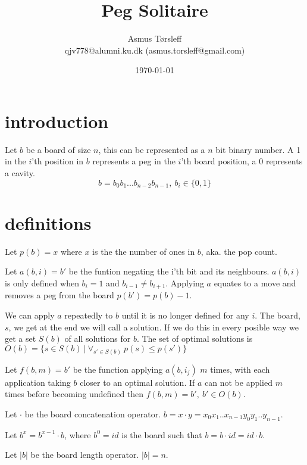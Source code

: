 \documentclass{article}
\title{Peg Solitaire}
\author{
\centering
\begin{tabular}{c}
    Asmus Tørsleff\\
    qjv778@alumni.ku.dk (asmus.torsleff@gmail.com)\\
\end{tabular}}
\date{\today}
\begin{document}
\maketitle
\section{introduction}
Let $b$ be a board of size $n$, this can be represented as a $n$ bit binary number. 
A 1 in the $i$'th position in $b$ represents a peg in the $i$'th board position, a 0 represents a cavity.
$$b=b_0b_1...b_{n-2}b_{n-1},\ b_i\in \{0,1\}$$

\section{definitions}
Let $p(b)=x$ where $x$ is the the number of ones in $b$, aka. the pop count. 

\vspace{\baselineskip}
\noindent
Let $a(b, i)=b'$ be the funtion negating the i'th bit and its neighbours. $a(b,i)$ is only defined when $b_{i} = 1$ and $b_{i-1} \neq b_{i+1}$.  
Applying $a$ equates to a move and removes a peg from the board $p(b')=p(b)-1$.

\vspace{\baselineskip}
\noindent
We can apply $a$ repeatedly to $b$ until it is no longer defined for any $i$. 
The board, $s$, we get at the end we will call a solution.
If we do this in every posible way we get a set $S(b)$ of all solutions for $b$.
The set of optimal solutions is $O(b)=\{s\in S(b)\ |\ \forall_{s'\in S(b)}\ p(s)\le p(s')\}$

\vspace{\baselineskip}
\noindent
Let $f(b,m)=b'$ be the function applying $a(b,i_j)$ $m$ times, with each application taking $b$ closer to an optimal solution. 
If $a$ can not be applied $m$ times before becoming undefined then $f(b,m) = b',\ b'\in O(b)$. 

\vspace{\baselineskip}
\noindent
Let $\cdot$ be the board concatenation operator. $b=x\cdot y=x_0x_1..x_{n-1}y_0y_1..y_{n-1} $. 

\vspace{\baselineskip}
\noindent
Let $b^x=b^{x-1}\cdot b$, where $b^0=id$ is the board such that $b =b\cdot id=id\cdot b$. 

\vspace{\baselineskip}
\noindent
Let $|b|$ be the board length operator. $|b|=n$. 
\end{document}
